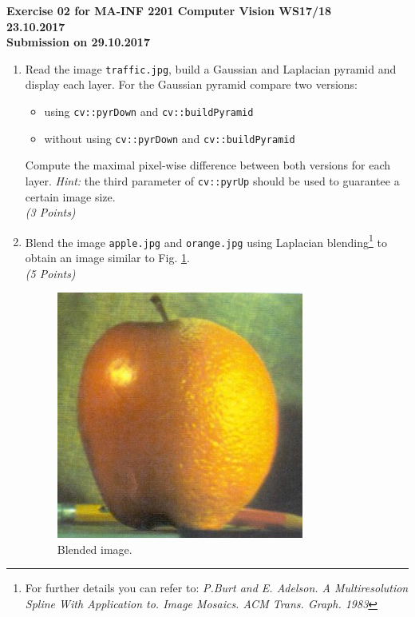 \documentclass[11pt]{article}
\begin{document}
\begin{center}

	\textbf{Exercise 02 for MA-INF 2201 Computer Vision WS17/18	\\
		      23.10.2017					\\
	Submission on 29.10.2017					}

\end{center}

\vspace{0cm}

\begin{enumerate}

	\item	Read the image \texttt{traffic.jpg}, build a Gaussian and Laplacian pyramid and display each layer. 
		For the Gaussian pyramid compare two versions:
		\begin{itemize}
			\item         using \texttt{cv::pyrDown} and \texttt{cv::buildPyramid}
			\item without using \texttt{cv::pyrDown} and \texttt{cv::buildPyramid}
		\end{itemize}	
		Compute the maximal pixel-wise difference between both versions for each layer.\quad%
		\emph{Hint:} the third parameter of \texttt{cv::pyrUp} should be used to guarantee a certain image size.\\
		\emph{(3 Points)}
		
	\item	Blend the image \texttt{apple.jpg} and \texttt{orange.jpg} using Laplacian blending\footnote{For further details you can refer to: \emph{P.Burt and E. Adelson. A Multiresolution Spline With Application to. Image Mosaics. ACM Trans. Graph. 1983}} to obtain an image similar to Fig. \ref{fig:blendedIMG}.\\
		\emph{(5 Points)}
	
					\begin{figure}[hb]
					\vspace*{-2mm}
					\centering
						\includegraphics[height=0.28 \linewidth]{blended.png}
					\vspace*{-2mm}
					\caption{Blended image.}\label{fig:blendedIMG}
					\end{figure}


\end{enumerate}
\end{document}
